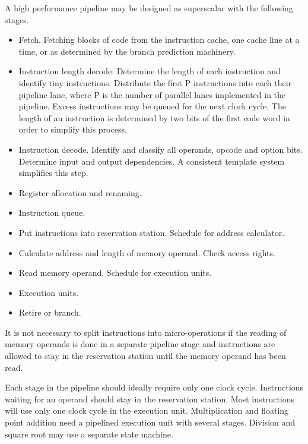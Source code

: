 \documentclass[forwardcom.tex]{subfiles}
\begin{document}
A high performance pipeline may be designed as superscalar with the following stages.
\begin{itemize}
\item  Fetch. Fetching blocks of code from the instruction cache, one cache line at a time, or as determined by the branch prediction machinery. 

\item  Instruction length decode. Determine the length of each instruction and identify tiny instructions. Distribute the first P instructions into each their pipeline lane, where P is the number of parallel lanes implemented in the pipeline. Excess instructions may be queued for the next clock cycle. The length of an instruction is determined by two bits of the first code word in order to simplify this process.

\item  Instruction decode. Identify and classify all operands, opcode and option bits. Determine input and output dependencies. A consistent template system simplifies this step.

\item  Register allocation and renaming. 

\item  Instruction queue. 

\item  Put instructions into reservation station. Schedule for address calculator. 

\item  Calculate address and length of memory operand. Check access rights.

\item  Read memory operand. Schedule for execution units.  

\item  Execution units.  

\item  Retire or branch. 
\end{itemize}

It is not necessary to split instructions into micro-operations if the reading of memory operands is done in a separate pipeline stage and instructions are allowed to stay in the reservation station until the memory operand has been read. 
\vspace{2mm}

Each stage in the pipeline should ideally require only one clock cycle. Instructions waiting for an operand should stay in the reservation station. Most instructions will use only one clock cycle in the execution unit. Multiplication and floating point addition need a pipelined execution unit with several stages. Division and square root may use a separate state machine. 
\vspace{2mm}
\end{document}
